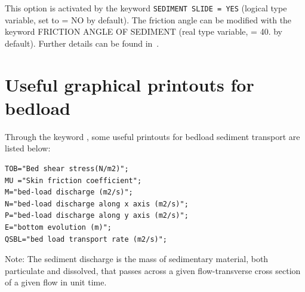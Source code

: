 This option is activated by the keyword \texttt{SEDIMENT SLIDE = YES} (logical type variable, set to {\ttfamily = NO} by default). The friction angle can be modified with the keyword {\ttfamily FRICTION ANGLE OF SEDIMENT} (real type variable, {\ttfamily = 40.} by default). Further details can be found in~\cite{ElKadiAbderrezzak201675}.



\pagebreak

\section{Useful graphical printouts for bedload}
Through the keyword , some useful printouts for bedload sediment transport are listed below:
\begin{lstlisting}[frame=trBL]  
TOB="Bed shear stress(N/m2)";
MU ="Skin friction coefficient";
M="bed-load discharge (m2/s)";
N="bed-load discharge along x axis (m2/s)";
P="bed-load discharge along y axis (m2/s)";
E="bottom evolution (m)";
QSBL="bed load transport rate (m2/s)";
\end{lstlisting}

\begin{WarningBlock}{Note:}
The sediment discharge is the mass of sedimentary material, both particulate and dissolved, that passes across a given flow-transverse cross section of a given flow in unit time.  
\end{WarningBlock}

